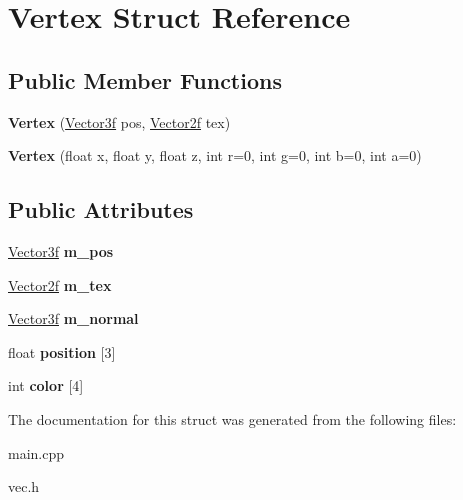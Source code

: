 \hypertarget{structVertex}{\section{Vertex Struct Reference}
\label{structVertex}
}
\subsection*{Public Member Functions}
\begin{DoxyCompactItemize}
\item 
\hypertarget{structVertex_a993e0ab5c12a1ff7364844b27f516439}{{\bfseries Vertex} (\hyperlink{structVector3f}{Vector3f} pos, \hyperlink{structVector2f}{Vector2f} tex)}\label{structVertex_a993e0ab5c12a1ff7364844b27f516439}

\item 
\hypertarget{structVertex_ab841cd3dc8fece6183da8b385bff1c60}{{\bfseries Vertex} (float x, float y, float z, int r=0, int g=0, int b=0, int a=0)}\label{structVertex_ab841cd3dc8fece6183da8b385bff1c60}

\end{DoxyCompactItemize}
\subsection*{Public Attributes}
\begin{DoxyCompactItemize}
\item 
\hypertarget{structVertex_a0b8d5bf5f9c21cfbf1ec4719984498f8}{\hyperlink{structVector3f}{Vector3f} {\bfseries m\-\_\-pos}}\label{structVertex_a0b8d5bf5f9c21cfbf1ec4719984498f8}

\item 
\hypertarget{structVertex_a4df696726104af6752cdcaed93ab7036}{\hyperlink{structVector2f}{Vector2f} {\bfseries m\-\_\-tex}}\label{structVertex_a4df696726104af6752cdcaed93ab7036}

\item 
\hypertarget{structVertex_a2ca497274bb25f05da0133c49852ab3b}{\hyperlink{structVector3f}{Vector3f} {\bfseries m\-\_\-normal}}\label{structVertex_a2ca497274bb25f05da0133c49852ab3b}

\item 
\hypertarget{structVertex_a1a5f22694da8ef6c906956eea8ddc924}{float {\bfseries position} \mbox{[}3\mbox{]}}\label{structVertex_a1a5f22694da8ef6c906956eea8ddc924}

\item 
\hypertarget{structVertex_a4eba6461d6ce8492a36046cf6ab675ee}{int {\bfseries color} \mbox{[}4\mbox{]}}\label{structVertex_a4eba6461d6ce8492a36046cf6ab675ee}

\end{DoxyCompactItemize}


The documentation for this struct was generated from the following files\-:\begin{DoxyCompactItemize}
\item 
main.\-cpp\item 
vec.\-h\end{DoxyCompactItemize}
